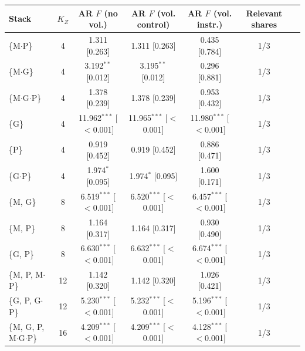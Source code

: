 \begin{tabular}{@{}lcccccc@{}}
\toprule
Stack & $K_Z$ & AR $F$ (no vol.) & AR $F$ (vol. control) & AR $F$ (vol. instr.) & Relevant shares \\
\midrule
\{M$\cdot$P\} & 4 & 1.311 [0.263] & 1.311 [0.263] & 0.435 [0.784] & 1/3 \\
\{M$\cdot$G\} & 4 & 3.192$^{**}$ [0.012] & 3.195$^{**}$ [0.012] & 0.296 [0.881] & 1/3 \\
\{M$\cdot$G$\cdot$P\} & 4 & 1.378 [0.239] & 1.378 [0.239] & 0.953 [0.432] & 1/3 \\
\{G\} & 4 & 11.962$^{***}$ [$<$0.001] & 11.965$^{***}$ [$<$0.001] & 11.980$^{***}$ [$<$0.001] & 1/3 \\
\{P\} & 4 & 0.919 [0.452] & 0.919 [0.452] & 0.886 [0.471] & 1/3 \\
\{G$\cdot$P\} & 4 & 1.974$^{*}$ [0.095] & 1.974$^{*}$ [0.095] & 1.600 [0.171] & 1/3 \\
\{M, G\} & 8 & 6.519$^{***}$ [$<$0.001] & 6.520$^{***}$ [$<$0.001] & 6.457$^{***}$ [$<$0.001] & 1/3 \\
\{M, P\} & 8 & 1.164 [0.317] & 1.164 [0.317] & 0.930 [0.490] & 1/3 \\
\{G, P\} & 8 & 6.630$^{***}$ [$<$0.001] & 6.632$^{***}$ [$<$0.001] & 6.674$^{***}$ [$<$0.001] & 1/3 \\
\{M, P, M$\cdot$P\} & 12 & 1.142 [0.320] & 1.142 [0.320] & 1.026 [0.421] & 1/3 \\
\{G, P, G$\cdot$P\} & 12 & 5.230$^{***}$ [$<$0.001] & 5.232$^{***}$ [$<$0.001] & 5.196$^{***}$ [$<$0.001] & 1/3 \\
\{M, G, P, M$\cdot$G$\cdot$P\} & 16 & 4.209$^{***}$ [$<$0.001] & 4.209$^{***}$ [$<$0.001] & 4.128$^{***}$ [$<$0.001] & 1/3 \\
\bottomrule
\end{tabular}

